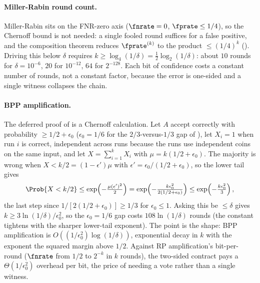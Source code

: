 \paragraph{Miller-Rabin round count.}
Miller-Rabin sits on the FNR-zero axis ($\fnrate = 0$, $\fprate \le 1/4$), so the
Chernoff bound is not needed: a single fooled round suffices for a false
positive, and the composition theorem reduces $\fprate^{(k)}$ to the product
$\le (1/4)^k$ (). Driving this below $\delta$
requires $k \ge \log_4(1/\delta) = \tfrac12\log_2(1/\delta)$: about $10$ rounds
for $\delta = 10^{-6}$, $20$ for $10^{-12}$, $64$ for $2^{-128}$. Each bit of
confidence costs a constant number of rounds, not a constant factor, because the
error is one-sided and a single witness collapses the chain.

\paragraph{BPP amplification.}
The deferred proof of  is a Chernoff
calculation. Let
$A$ accept correctly with probability $\ge 1/2 + \epsilon_0$ ($\epsilon_0 = 1/6$
for the $2/3$-versus-$1/3$ gap of ), let $X_i = 1$ when run $i$ is
correct, independent across runs because the runs use independent coins on the
same input, and let $X = \sum_{i=1}^k X_i$
with $\mu = k(1/2 + \epsilon_0)$. The majority is wrong when $X < k/2 = (1 -
\epsilon')\mu$ with $\epsilon' = \epsilon_0/(1/2 + \epsilon_0)$, so the lower tail
gives
\[
  \Prob{X < k/2} \le \exp\!\left(-\tfrac{\mu(\epsilon')^2}{2}\right)
  = \exp\!\left(-\tfrac{k\epsilon_0^2}{2(1/2 + \epsilon_0)}\right)
  \le \exp\!\left(-\tfrac{k\epsilon_0^2}{3}\right),
\]
the last step since $1/[2(1/2 + \epsilon_0)] \ge 1/3$ for $\epsilon_0 \le 1$.
Asking this be $\le \delta$ gives $k \ge 3\ln(1/\delta)/\epsilon_0^2$, so the
$\epsilon_0 = 1/6$ gap costs $108\ln(1/\delta)$ rounds (the constant tightens
with the sharper lower-tail exponent). The point is the shape: BPP amplification
is $O((1/\epsilon_0^2)\log(1/\delta))$, exponential decay in $k$ with the
exponent the squared margin above $1/2$. Against RP amplification's bit-per-round
($\fnrate$ from $1/2$ to $2^{-k}$ in $k$ rounds), the two-sided contract pays a
$\Theta(1/\epsilon_0^2)$ overhead per bit, the price of needing a vote rather
than a single witness.

